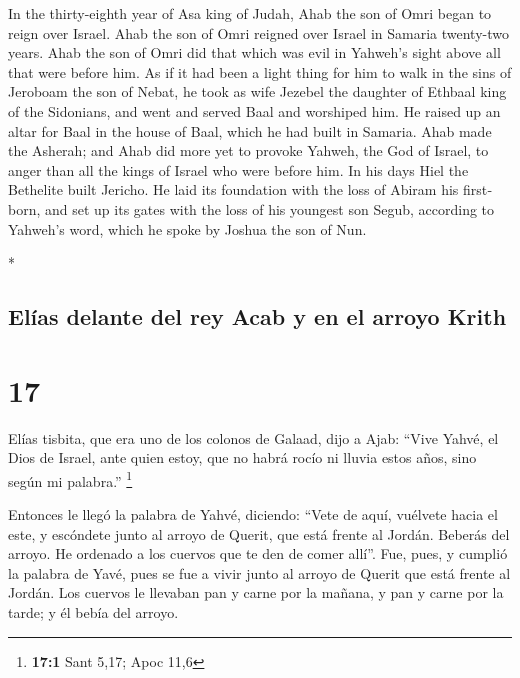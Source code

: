 \begin{paracol}{2}
\begin{otherlanguage}{english}
 In the thirty-eighth year of Asa king of Judah, Ahab the
son of Omri began to reign over Israel. Ahab the son of Omri reigned
over Israel in Samaria twenty-two years.  Ahab the son of
Omri did that which was evil in Yahweh's sight above all that were
before him.  As if it had been a light thing for him to
walk in the sins of Jeroboam the son of Nebat, he took as wife Jezebel
the daughter of Ethbaal king of the Sidonians, and went and served Baal
and worshiped him.  He raised up an altar for Baal in the
house of Baal, which he had built in Samaria.  Ahab made
the Asherah; and Ahab did more yet to provoke Yahweh, the God of Israel,
to anger than all the kings of Israel who were before him.
 In his days Hiel the Bethelite built Jericho. He laid
its foundation with the loss of Abiram his firstborn, and set up its
gates with the loss of his youngest son Segub, according to Yahweh's
word, which he spoke by Joshua the son of Nun.

\end{otherlanguage}

\switchcolumn[0]*

\hypertarget{eluxedas-delante-del-rey-acab-y-en-el-arroyo-krith}{%
\subsection{Elías delante del rey Acab y en el arroyo
Krith}\label{eluxedas-delante-del-rey-acab-y-en-el-arroyo-krith}}

\hypertarget{section-32}{%
\section{17}\label{section-32}}

 Elías tisbita, que era uno de los colonos de Galaad, dijo
a Ajab: ``Vive Yahvé, el Dios de Israel, ante quien estoy, que no habrá
rocío ni lluvia estos años, sino según mi palabra.'' \footnote{\textbf{17:1}
  Sant 5,17; Apoc 11,6}

 Entonces le llegó la palabra de Yahvé, diciendo:
 ``Vete de aquí, vuélvete hacia el este, y escóndete junto
al arroyo de Querit, que está frente al Jordán.  Beberás
del arroyo. He ordenado a los cuervos que te den de comer allí''.
 Fue, pues, y cumplió la palabra de Yavé, pues se fue a
vivir junto al arroyo de Querit que está frente al Jordán.
 Los cuervos le llevaban pan y carne por la mañana, y pan
y carne por la tarde; y él bebía del arroyo.


\end{paracol}
